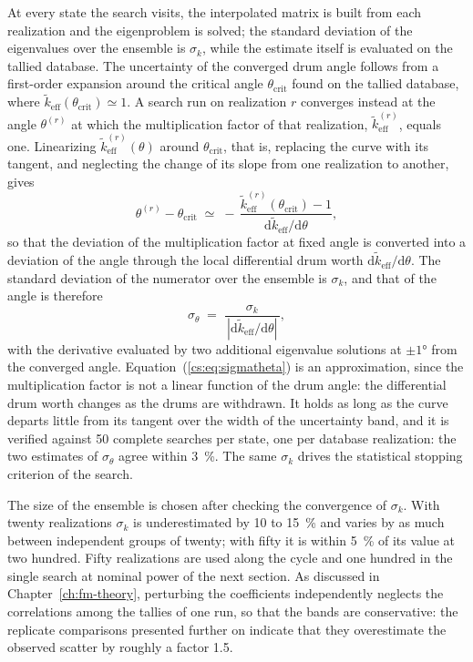 At every state the search visits, the interpolated matrix is built from each
realization and the eigenproblem is solved; the standard deviation of the
eigenvalues over the ensemble is $\sigma_k$, while the estimate itself is
evaluated on the tallied database. The uncertainty of the converged drum angle
follows from a first-order expansion around the critical angle
$\theta_{\mathrm{crit}}$ found on the tallied database, where
$\tilde k_{\mathrm{eff}}(\theta_{\mathrm{crit}})\simeq1$. A search run on realization $r$
converges instead at the angle $\theta^{(r)}$ at which the multiplication
factor of that realization, $\tilde k^{(r)}_{\mathrm{eff}}$, equals one. Linearizing
$\tilde k^{(r)}_{\mathrm{eff}}(\theta)$ around $\theta_{\mathrm{crit}}$, that is,
replacing the curve with its tangent, and neglecting the change of its slope
from one realization to another, gives
%
\begin{equation*}
  \theta^{(r)}-\theta_{\mathrm{crit}} \;\simeq\;
  -\,\frac{\tilde k^{(r)}_{\mathrm{eff}}(\theta_{\mathrm{crit}})-1}
          {\mathrm d \tilde k_{\mathrm{eff}}/\mathrm d\theta},
\end{equation*}
%
so that the deviation of the multiplication factor at fixed angle is converted
into a deviation of the angle through the local differential drum worth
$\mathrm d \tilde k_{\mathrm{eff}}/\mathrm d\theta$. The standard deviation of the
numerator over the ensemble is $\sigma_k$, and that of the angle is therefore
%
\begin{equation}
  \sigma_\theta \;=\; \frac{\sigma_k}{\,|\mathrm d \tilde k_{\mathrm{eff}}/\mathrm d\theta|\,},
  \label{cs:eq:sigmatheta}
\end{equation}
%
with the derivative evaluated by two additional eigenvalue solutions at
$\pm\ang{1}$ from the converged angle. Equation~(\ref{cs:eq:sigmatheta}) is an
approximation, since the multiplication factor is not a linear function of the
drum angle: the differential drum worth changes as the drums are withdrawn. It
holds as long as the curve departs little from its tangent over the width of
the uncertainty band, and it is verified against 50 complete searches per
state, one per database realization: the two estimates of $\sigma_\theta$
agree within \SI{3}{\percent}. The same
$\sigma_k$ drives the statistical stopping criterion of the search.

The size of the ensemble is chosen after checking the convergence of
$\sigma_k$. With twenty realizations $\sigma_k$ is underestimated by 10 to
\SI{15}{\percent} and varies by as much between independent groups of twenty;
with fifty it is within \SI{5}{\percent} of its value at two hundred. Fifty
realizations are used along the cycle and one
hundred in the single search at nominal power of the next section. As
discussed in Chapter~\ref{ch:fm-theory}, perturbing the coefficients independently
neglects the correlations among the tallies of one run, so that the bands are
conservative: the replicate comparisons presented further on
indicate that they overestimate the observed scatter by roughly a factor 1.5.

